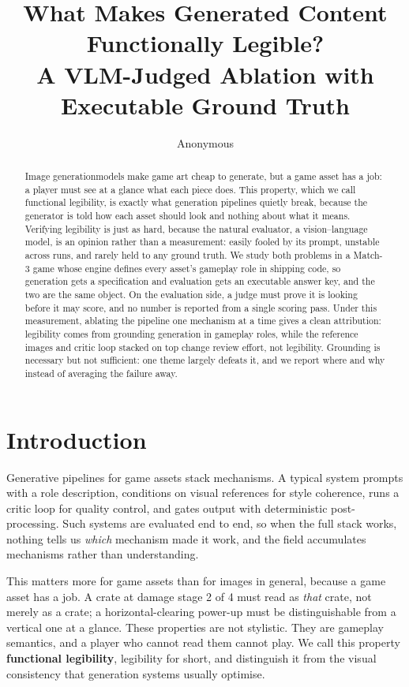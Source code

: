 \documentclass{article}
\title{What Makes Generated Content Functionally Legible?\\
A VLM-Judged Ablation with Executable Ground Truth}
\author{Anonymous}
\begin{document}
\maketitle

\begin{abstract}
Image generationmodels make game art cheap to generate, but a game asset has a job: a player must see at a
glance what each piece does. This property, which we call functional legibility, is exactly what
generation
pipelines quietly break, because the generator is told how each asset should look and nothing about
what it means. Verifying legibility is just as hard, because the natural evaluator, a
vision--language model, is an opinion rather than a measurement: easily fooled by its prompt,
unstable across runs, and rarely held to any ground truth. We study both problems in a Match-3 game
whose engine defines every asset's gameplay role in shipping code, so generation gets a
specification and evaluation gets an executable answer key, and the two are the same object. On the
evaluation side, a judge must prove it is looking before it may score, and no number is reported
from a single scoring pass. Under this measurement, ablating the pipeline one mechanism at a time
gives a clean attribution: legibility comes from grounding generation in gameplay roles, while the
reference images and critic loop stacked on top change review effort, not legibility. Grounding is
necessary but not sufficient: one theme largely defeats it, and we report where and why instead of
averaging the failure away.
\end{abstract}

\section{Introduction}

Generative pipelines for game assets stack mechanisms. A typical system prompts with a role
description, conditions on visual references for style coherence, runs a critic loop for quality
control, and gates output with deterministic post-processing. Such systems are evaluated end to
end, so when the full stack works, nothing tells us
\emph{which} mechanism made it work, and the field accumulates mechanisms rather than
understanding.

This matters more for game assets than for images in general, because a game asset has a job. A
crate at damage stage 2 of 4 must read as \emph{that} crate, not merely as a crate; a
horizontal-clearing power-up must be distinguishable from a vertical one at a glance. These
properties are not stylistic. They are gameplay semantics, and a player who cannot read them cannot
play. We call this property \textbf{functional legibility}, legibility for short, and distinguish
it from the visual consistency that
generation systems usually optimise.
\end{document}
